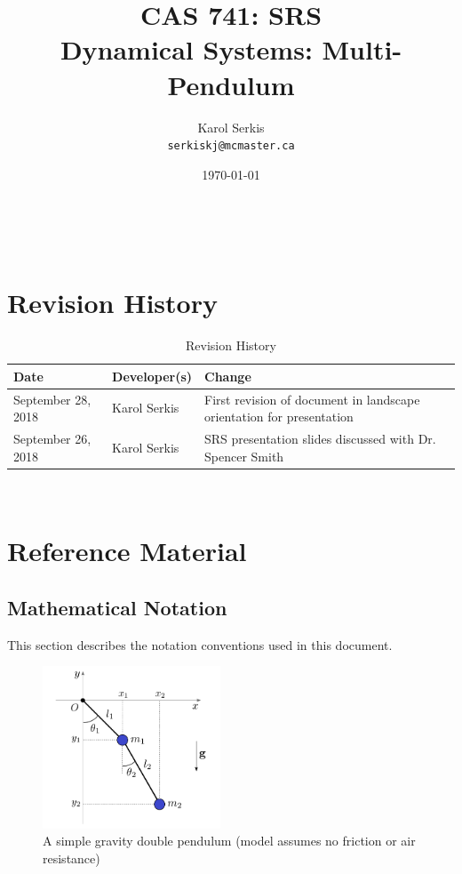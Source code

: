 \documentclass[12pt]{article}
\begin{document}

\title{CAS 741: SRS\\[10pt]\Large Dynamical Systems: Multi-Pendulum}
\author{Karol Serkis\\\texttt{serkiskj@mcmaster.ca}}
\date{\today}
	
\maketitle

~\newpage

\tableofcontents

\clearpage

\setcounter{secnumdepth}{0}

\section{Revision History}

\begin{table}[hp]
\caption{Revision History}
\begin{tabularx}{\textwidth}{llX}
\toprule
\textbf{Date} & \textbf{Developer(s)} & \textbf{Change}\\
\midrule
September 28, 2018 & Karol Serkis & First revision of document in landscape orientation for presentation\\
September 26, 2018 & Karol Serkis & SRS presentation slides discussed with Dr. Spencer Smith \\
\bottomrule
\end{tabularx}
\end{table}

~\newpage

\section{Reference Material}

\subsection{Mathematical Notation}

This section describes the notation conventions used in this document.

\begin{figure}[H]
	\centering
	\includegraphics[width=200px]{doublepend.PNG}
	\caption{A simple gravity double pendulum (model assumes no friction or air resistance)}
	\label{fig:maxresdefault}
\end{figure}
\end{document}
